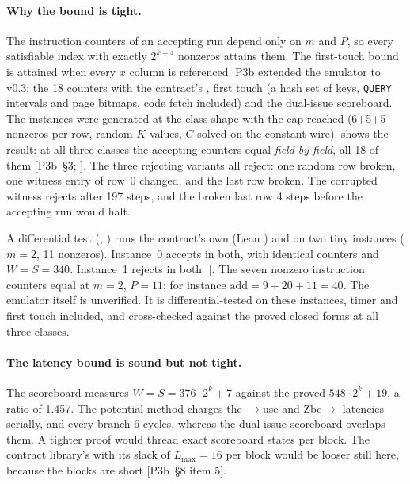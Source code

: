 \paragraph{Why the bound is tight.} The instruction counters of an accepting run depend only on $m$
and $P$, so every satisfiable index with exactly $2^{k+4}$ nonzeros attains them. The first-touch
bound is attained when every $x$ column is referenced. P3b extended the emulator  to
v0.3: the 18 counters with the contract's , first touch (a hash set of keys,
\texttt{QUERY} intervals and page bitmaps, code fetch included) and the dual-issue scoreboard. The
instances were generated at the class shape with the cap reached (6+5+5 nonzeros per row, random $K$
values, $C$ solved on the constant wire).  shows the result: at all three classes
the accepting counters equal  \emph{field by field}, all 18 of them
[P3b~§3; ]. The three rejecting variants all reject: one random row broken, one
witness entry of row~0 changed, and the last row broken. The corrupted witness rejects after 197
steps, and the broken last row 4 steps before the accepting run would halt.

A differential test (, ) runs the contract's own 
(Lean ) and  on two tiny instances ($m=2$, 11 nonzeros). Instance~0 accepts
in both, with identical counters
\code{[40, 38, 4, 0, 0, 50, 40, 0, 0, 0, 21, 0, 1, 113, 7, 2, 0, 544]} and $W=S=340$. Instance~1
rejects in both []. The seven nonzero instruction counters equal
 at $m=2$, $P=11$; for instance $\mathrm{add}=9+20+11=40$. The emulator itself is
unverified. It is differential-tested on these instances, timer and first touch included, and
cross-checked against the proved closed forms at all three classes.

\paragraph{The latency bound is sound but not tight.} The scoreboard measures
$W=S=376\cdot2^k+7$ against the proved $548\cdot2^k+19$, a ratio of 1.457. The potential method
charges the $\to$use and Zbc$\to$ latencies serially, and every branch 6 cycles,
whereas the dual-issue scoreboard overlaps them. A tighter proof would thread exact scoreboard states
per block. The contract library's  with its slack of $L_{\max}=16$ per block would
be looser still here, because the blocks are short [P3b~§8 item 5].

